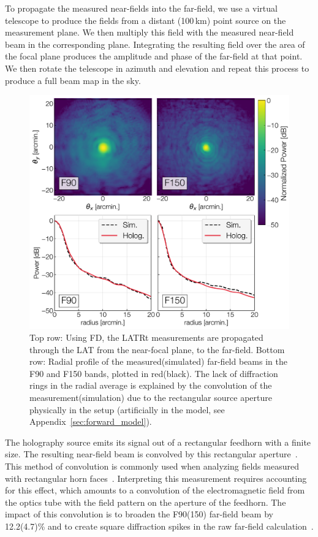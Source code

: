 To propagate the measured near-fields into the far-field, we use a virtual telescope to produce the fields from a distant (100\,km) point source on the measurement plane.  We then multiply this field with the measured near-field beam in the corresponding plane.  Integrating the resulting field over the area of the focal plane produces the amplitude and phase of the far-field at that point.  We then rotate the telescope in azimuth and elevation and repeat this process to produce a full beam map in the sky.

\begin{figure}[ht!]
    \centering
    \includegraphics[width = \textwidth]{Figures/MF_ff.pdf}
    \caption{Top row: Using FD, the LATRt measurements are propagated through the LAT from the near-focal plane, to the far-field.  Bottom row: Radial profile of the measured(simulated) far-field beams in the F90 and F150 bands, plotted in red(black).  The lack of diffraction rings in the radial average is explained by the convolution of the measurement(simulation) due to the rectangular source aperture physically in the setup (artificially in the model, see Appendix~\ref{sec:forward_model}).}
    \label{fig:farfields}
\end{figure}

The holography source emits its signal out of a rectangular feedhorn with a finite size.  The resulting near-field beam is convolved by this rectangular aperture~\cite{Goodman2005-ne}.  This method of convolution is commonly used when analyzing fields measured with rectangular horn faces~\cite{1141856,Karimipour2019ShapingEW}.  Interpreting this measurement requires accounting for this effect, which amounts to a convolution of the electromagnetic field from the optics tube with the field pattern on the aperture of the feedhorn.  The impact of this convolution is to broaden the F90(150) far-field beam by 12.2(4.7)\% and to create square diffraction spikes in the raw far-field calculation~\cite{Goodman2005-ne}.

